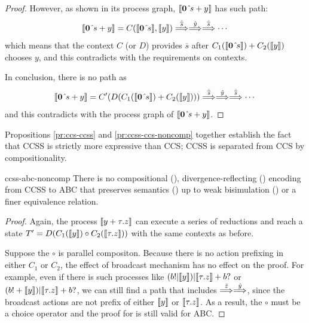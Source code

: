 \documentclass[adraft,hidelinks]{eptcs}
\begin{document}
\begin{proof}
  However, as shown in its process graph, $\bkt{\nil\signals{s} + y} $ has such path:
  \[
  \bkt{\nil\signals{s} + y} = C(\bkt{\nil\signals{s}}, \bkt{y})\hvred{\overline{s}}\hvred{y}\hvred{\overline{s}}\cdots
  \]
  which means that the context $C$ (or $D$) provides $\overline{s}$ after $C_1(\bkt{\nil\signals{s}})+C_2(\bkt{y})$ chooses $y$, and this contradicts with the requirements on contexts.

  In conclusion, there is no path as
  \[\bkt{\nil\signals{s} + y} = C'(D(C_1(\bkt{\nil\signals{s}})+C_2(\bkt{y})))\hvred{\overline{s}}\hvred{y}\hvred{\overline{s}}\cdots\]
  and this contradicts with the process graph of $\bkt{\nil\signals{s} + y}$.

\end{proof}

Propositions \ref{pr:ccs-ccss} and \ref{pr:ccss-ccs-noncomp} together establish the fact that CCSS is strictly more expressive than CCS; CCSS is separated from CCS by compositionality.

\begin{proposition}{ccss-abc-noncomp}
  There is no compositional (), divergence-reflecting () encoding from CCSS to ABC that preserves semantics () up to weak bisimulation () or a finer equivalence relation.
\end{proposition}

\begin{proof}
  Again, the process $\bkt{y+\tau.z}$ can execute a series of reductions and reach a state $T'=D(C_1(\bkt y)\circ C_2(\bkt{\tau.z}))$ with the same contexts as before.

  Suppose the $\circ$ is parallel compositon.
  Because there is no action prefixing in either $C_1$ or $C_2$, the effect of broadcast mechanism has no effect on the proof.
  For example, even if there is such processes like $(b!|\bkt y) | \bkt{\tau.z}+b?$ or $(b! + \bkt y) | \bkt{\tau.z}+b?$, we can still find a path that includes $\overset{\hat{z}}{\Longrightarrow}\overset{\hat{y}}{\Longrightarrow}$, since the broadcast actions are not prefix of either $\bkt y$ or $\bkt{\tau.z}$.
  As a result, the $\circ$ must be a choice operator and the proof for  is still valid for ABC.
\end{proof}
\end{document}
